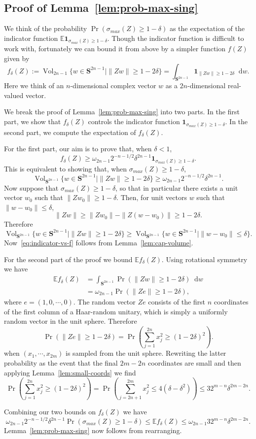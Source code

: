 \documentclass[11pt]{article}
\theoremstyle{plain}
\theoremstyle{plain}
\theoremstyle{plain}
\theoremstyle{plain}
\theoremstyle{plain}
\theoremstyle{plain}
\theoremstyle{plain}
\theoremstyle{remark}
\theoremstyle{remark}
\theoremstyle{plain}
\theoremstyle{plain}
\theoremstyle{plain}
\theoremstyle{plain}
\DeclareMathOperator{\vol}{Vol}
\newcommand{\diff}{\mathop{}\!\mathrm{d}}
\newcommand{\Expec}{\mathbb E}
\newcommand{\Prob}{\Pr}
\newcommand{\Sphere}{{\mathbf S}}
\newcommand{\One}{{\mathbf{1}}}
\begin{document}
\subsection{Proof of Lemma~\ref{lem:prob-max-sing}}

We think of the probability $\Prob(\sigma_{max}(Z) \geq 1-\delta)$ as the expectation of the indicator function
$\Expec \One_{\sigma_{max}(Z)\geq 1-\delta}$.  Though the indicator function is difficult to work with, fortunately
we can bound it from above by a simpler function $f(Z)$ given by
\[
f_\delta(Z) := \vol_{2n-1}\{w\in \Sphere^{2n-1} \mid \|Zw\| \geq 1-2\delta\}
= \int_{\Sphere^{2n-1}} \One_{\|Zw\| \geq 1-2\delta} \diff w.
\]
Here we think of an $n$-dimensional complex vector $w$ as a $2n$-dimensional real-valued vector.

We break the proof of Lemma~\ref{lem:prob-max-sing} into two parts.  In the first part, we show that
$f_\delta(Z)$ controls the indicator function $\One_{\sigma_{max}(Z)\geq 1-\delta}$.  In the second part,
we compute the expectation of $f_\delta(Z)$.

For the first part, our aim is to prove that, when $\delta < 1$,
\begin{equation}
\label{eq:indicator-vs-f}
f_\delta(Z) \geq \omega_{2n-1}2^{-n-1/2} \delta^{2n-1}
\One_{\sigma_{max}(Z) \geq 1-\delta}.
\end{equation}
This is equivalent to showing that, when $\sigma_{max}(Z)\geq 1-\delta$,
\[
\vol_{\Sphere^{2n-1}}\{w\in \Sphere^{2n-1} \mid \|Zw\| \geq 1-2\delta\}
\geq \omega_{2n-1}2^{-n-1/2} \delta^{2n-1}.
\]
Now suppose that $\sigma_{max}(Z)\geq 1-\delta$, so that in particular there exists a unit
vector $w_0$ such that $\|Zw_0\| \geq 1-\delta$.  Then, for unit vectors $w$ such that $\|w-w_0\|\leq \delta$,
\[
\|Zw\| \geq \|Zw_0\| - \|Z(w-w_0)\| \geq 1-2\delta.
\]
Therefore
\[
\vol_{\Sphere^{2n-1}}\{w\in \Sphere^{2n-1} \mid \|Zw\| \geq 1-2\delta\}
\geq
\vol_{\Sphere^{2n-1}}\{w\in \Sphere^{2n-1} \mid \|w-w_0\|\leq \delta\}.
\]
Now~\eqref{eq:indicator-vs-f} follows from Lemma~\ref{lem:cap-volume}.

For the second part of the proof we bound $\Expec f_\delta(Z)$.  Using rotational symmetry
we have
\begin{equation}
\begin{split}
\Expec f_\delta(Z) &= \int_{\Sphere^{2n-1}} \Prob(\|Zw\|\geq 1-2\delta) \diff w \\
&= \omega_{2n-1} \Prob(\|Ze\| \geq 1-2\delta),
\end{split}
\end{equation}
where $e=(1,0,\cdots,0)$.  The random vector $Ze$ consists of the first $n$ coordinates of the first column of a
Haar-random unitary, which is simply a uniformly random vector in the unit sphere.  Therefore
\[
\Prob(\|Ze\|\geq 1-2\delta) = \Prob(\sum_{j=1}^{2n} x_j^2 \geq (1-2\delta)^2).
\]
when $(x_1,\cdots,x_{2m})$ is sampled from the unit sphere.  Rewriting the latter probability as the
event that the final $2m-2n$ coordinates are small and then applying Lemma~\ref{lem:small-coords} we find
\[
\Prob(\sum_{j=1}^{2n} x_j^2 \geq (1-2\delta)^2)
= \Prob(\sum_{j=2n+1}^{2m} x_j^2 \leq 4(\delta - \delta^2))
\leq 32^{m-n} \delta^{2m-2n}.
\]

Combining our two bounds on $f_\delta(Z)$ we have
\begin{equation}
\omega_{2n-1} 2^{-n-1/2} \delta^{2n-1} \Prob(\sigma_{max}(Z) \geq 1-\delta)
\leq
\Expec f_\delta(Z)
\leq \omega_{2n-1} 32^{m-n} \delta^{2m-2n}.
\end{equation}
Lemma~\ref{lem:prob-max-sing} now follows from rearranging.
\end{document}
